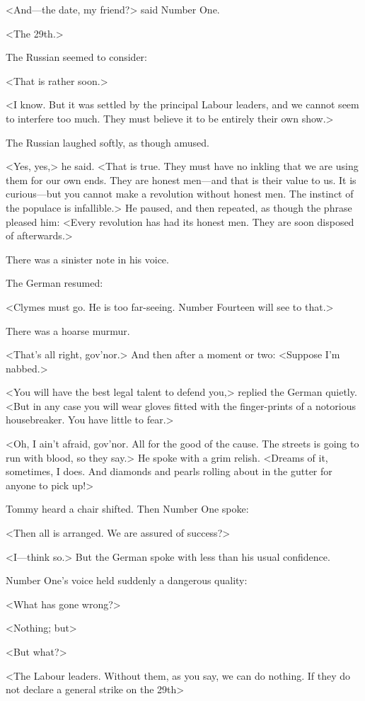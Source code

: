 <And—the date, my friend?> said Number One.

<The 29th.>

The Russian seemed to consider:

<That is rather soon.>

<I know. But it was settled by the principal Labour leaders, and we cannot seem to interfere too much. They must believe it to be entirely their own show.>

The Russian laughed softly, as though amused.

<Yes, yes,> he said. <That is true. They must have no inkling that we are using them for our own ends. They are honest men—and that is their value to us. It is curious—but you cannot make a revolution without honest men. The instinct of the populace is infallible.> He paused, and then repeated, as though the phrase pleased him: <Every revolution has had its honest men. They are soon disposed of afterwards.>

There was a sinister note in his voice.

The German resumed:

<Clymes must go. He is too far-seeing. Number Fourteen will see to that.>

There was a hoarse murmur.

<That's all right, gov'nor.> And then after a moment or two: <Suppose I'm nabbed.>

<You will have the best legal talent to defend you,> replied the German quietly. <But in any case you will wear gloves fitted with the finger-prints of a notorious housebreaker. You have little to fear.>

<Oh, I ain't afraid, gov'nor. All for the good of the cause. The streets is going to run with blood, so they say.> He spoke with a grim relish. <Dreams of it, sometimes, I does. And diamonds and pearls rolling about in the gutter for anyone to pick up!>

Tommy heard a chair shifted. Then Number One spoke:

<Then all is arranged. We are assured of success?>

<I—think so.> But the German spoke with less than his usual confidence.

Number One's voice held suddenly a dangerous quality:

<What has gone wrong?>

<Nothing; but\longdash>

<But what?>

<The Labour leaders. Without them, as you say, we can do nothing. If they do not declare a general strike on the 29th\longdash>

